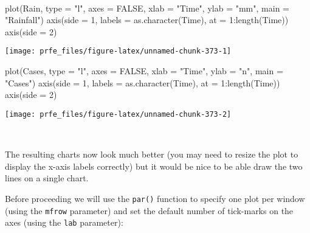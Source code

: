 \documentclass[
  12pt,
  a4paper]{book}
\newenvironment{Shaded}{\begin{snugshade}}{\end{snugshade}}
\newcommand{\AttributeTok}[1]{\textcolor[rgb]{0.77,0.63,0.00}{#1}}
\newcommand{\ConstantTok}[1]{\textcolor[rgb]{0.00,0.00,0.00}{#1}}
\newcommand{\DecValTok}[1]{\textcolor[rgb]{0.00,0.00,0.81}{#1}}
\newcommand{\FunctionTok}[1]{\textcolor[rgb]{0.00,0.00,0.00}{#1}}
\newcommand{\NormalTok}[1]{#1}
\newcommand{\SpecialCharTok}[1]{\textcolor[rgb]{0.00,0.00,0.00}{#1}}
\newcommand{\StringTok}[1]{\textcolor[rgb]{0.31,0.60,0.02}{#1}}
\begin{document}
~

\begin{Shaded}
\begin{Highlighting}[]
\FunctionTok{plot}\NormalTok{(Rain, }\AttributeTok{type =} \StringTok{"l"}\NormalTok{, }\AttributeTok{axes =} \ConstantTok{FALSE}\NormalTok{, }\AttributeTok{xlab =} \StringTok{"Time"}\NormalTok{, }\AttributeTok{ylab =} \StringTok{"mm"}\NormalTok{, }\AttributeTok{main =} \StringTok{"Rainfall"}\NormalTok{)}
\FunctionTok{axis}\NormalTok{(}\AttributeTok{side =} \DecValTok{1}\NormalTok{, }\AttributeTok{labels =} \FunctionTok{as.character}\NormalTok{(Time), }\AttributeTok{at =} \DecValTok{1}\SpecialCharTok{:}\FunctionTok{length}\NormalTok{(Time))}
\FunctionTok{axis}\NormalTok{(}\AttributeTok{side =} \DecValTok{2}\NormalTok{)}
\end{Highlighting}
\end{Shaded}

\begin{center}\texttt{[image: prfe\_files/figure-latex/unnamed-chunk-373-1]} \end{center}

\begin{Shaded}
\begin{Highlighting}[]
\FunctionTok{plot}\NormalTok{(Cases, }\AttributeTok{type =} \StringTok{"l"}\NormalTok{, }\AttributeTok{axes =} \ConstantTok{FALSE}\NormalTok{, }\AttributeTok{xlab =} \StringTok{"Time"}\NormalTok{, }\AttributeTok{ylab =} \StringTok{"n"}\NormalTok{, }\AttributeTok{main =} \StringTok{"Cases"}\NormalTok{)}
\FunctionTok{axis}\NormalTok{(}\AttributeTok{side =} \DecValTok{1}\NormalTok{, }\AttributeTok{labels =} \FunctionTok{as.character}\NormalTok{(Time), }\AttributeTok{at =} \DecValTok{1}\SpecialCharTok{:}\FunctionTok{length}\NormalTok{(Time))}
\FunctionTok{axis}\NormalTok{(}\AttributeTok{side =} \DecValTok{2}\NormalTok{)}
\end{Highlighting}
\end{Shaded}

\begin{center}\texttt{[image: prfe\_files/figure-latex/unnamed-chunk-373-2]} \end{center}

~

The resulting charts now look much better (you may need to resize the plot to display the x-axis labels correctly) but it would be nice to be able draw the two lines on a single chart.

Before proceeding we will use the \texttt{par()} function to specify one plot per window (using the \texttt{mfrow} parameter) and set the default number of tick-marks on the axes (using the \texttt{lab} parameter):
\end{document}
